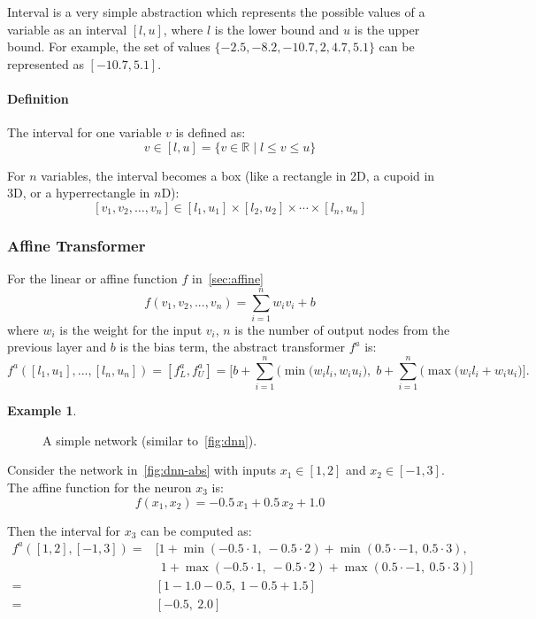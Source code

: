 \documentclass[oneside,11pt,dvipsnames]{book}
\numberwithin{equation}{section}
\theoremstyle{definition}
\newtheorem{example}{Example}[section]
\theoremstyle{remark}
\begin{document}
Interval is a very simple abstraction which represents the possible values of a variable as an interval $[l, u]$, where $l$ is the lower bound and $u$ is the upper bound.
For example, the set of values $\{-2.5, -8.2, -10.7, 2, 4.7, 5.1\}$ can be represented as $[-10.7, 5.1]$.

\paragraph{Definition}
The interval for one variable \(v\) is defined as:
\[
v \in [l, u] = \{v \in \mathbb{R} \mid l \le v \le u\}
\]


For $n$ variables, the interval becomes a box (like a rectangle in 2D, a cupoid in 3D, or a hyperrectangle in $n$D):
\[
[v_1, v_2, \ldots, v_n] \in [l_1, u_1] \times [l_2, u_2] \times \cdots \times [l_n, u_n]
\]


\subsubsection{Affine Transformer}\label{sec:interval-affine-transformer}

For the linear or affine function \(f\) in~\autoref{sec:affine}
\[f(v_1, v_2, ...,v_n) = \sum_{i=1}^{n} w_i v_i + b\]
where $w_i$ is the weight for the input \(v_i\), $n$ is the number of output nodes from the previous layer and \(b\) is the bias term, the abstract transformer \(f^a\) is:
\[
f^{a}([l_1, u_1],..., [l_n, u_n]) = [f^a_L, f^a_U] =
\Bigg[b + \sum_{i=1}^{n}\big(\min(w_il_i, w_iu_i\big),\; b+ \sum_{i=1}^{n}\big(\max(w_il_i + w_iu_i\big)\Bigg].
\]



\begin{example}\label{ex:transformer-affine1}

\begin{figure}
\centering
{}
\caption{\label{fig:dnn-abs}A simple network (similar to~\autoref{fig:dnn}).}
\end{figure}

Consider the network in~\autoref{fig:dnn-abs} with inputs \(x_1 \in [1, 2]\) and \(x_2 \in [-1, 3]\). The affine function for the neuron \(x_3\) is:
\[
f(x_1,x_2) = -0.5\,x_1 + 0.5\,x_2 + 1.0
\]

Then the interval for \(x_3\) can be computed as:
\small{
\[
\begin{aligned}
f^a([1,2],[-1,3]) = & \Bigg[ 1 + \min(-0.5 \cdot 1,~ -0.5 \cdot 2) + \min(0.5 \cdot -1,~ 0.5 \cdot 3),\\
& ~~1 + \max(-0.5 \cdot 1,~ -0.5 \cdot 2) + \max(0.5 \cdot -1,~ 0.5 \cdot 3)\Bigg]\\
= & [1 - 1.0 - 0.5,~ 1 - 0.5 + 1.5]\\
= & [-0.5,~ 2.0]
\end{aligned}
\]
}
\end{example}
\end{document}
